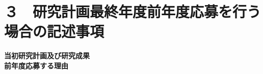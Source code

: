 \documentclass[11pt,a4j,dvipdfmx]{jarticle} 					%
\newcommand{\研究課題名}{加速器実験による短距離バリオン間相互作用の解明と中性子星ハイペロンパズルの解決}
\newcommand{\研究機関名}{東北大学}
\newcommand{\研究代表者氏名}{市川裕大}
\newcommand{\研究期間の最終元号年度}{13}  %
\begin{document}
\section{３　研究計画最終年度前年度応募を行う場合の記述事項}

\newcommand{\最終年度研究種目名}{基盤研究（）}
\newcommand{\最終年度研究課題番号}{?????}
\newcommand{\最終年度研究課題名}{}
\newcommand{\最終年度研究期間}{令和？？年度〜令和\一年目 年度}


\noindent
\textbf{当初研究計画及び研究成果}\\



\noindent
\textbf{前年度応募する理由}\\









\end{document}
